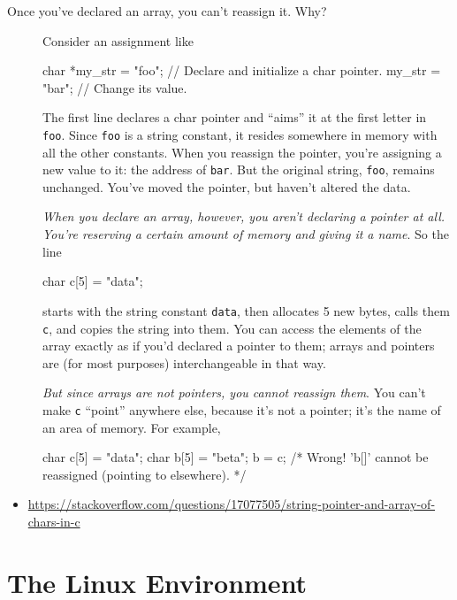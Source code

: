 \begin{description}
\item[Once you've declared an array, you can't reassign it. Why?] Consider an assignment like

\begin{ccode}
char *my_str = "foo"; // Declare and initialize a char pointer.
my_str = "bar"; // Change its value.
\end{ccode}

The first line declares a char pointer and ``aims'' it at the first letter in \texttt{foo}. Since \texttt{foo} is a string constant, it resides somewhere in memory with all the other constants. When you reassign the pointer, you're assigning a new value to it: the address of \texttt{bar}. But the original string, \texttt{foo}, remains unchanged. You've moved the pointer, but haven't altered the data.

\emph{When you declare an array, however, you aren't declaring a pointer at all. You're reserving a certain amount of memory and giving it a name}. So the line

\begin{ccode}
char c[5] = "data";
\end{ccode}

starts with the string constant \texttt{data}, then allocates 5 new bytes, calls them \texttt{c}, and copies the string into them. You can access the elements of the array exactly as if you'd declared a pointer to them; arrays and pointers are (for most purposes) interchangeable in that way.

\emph{But since arrays are not pointers, you cannot reassign them}. You can't make
\texttt{c} ``point'' anywhere else, because it's not a pointer; it's the name of an area of
memory. For example,

\begin{ccode}
char c[5] = "data";
char b[5] = "beta";
b = c; /* Wrong! 'b[]' cannot be reassigned (pointing to elsewhere). */
\end{ccode}
\end{description}

\begin{itemize}
\item \url{https://stackoverflow.com/questions/17077505/string-pointer-and-array-of-chars-in-c}
\end{itemize}  


\section{The Linux Environment}
\label{sec:linux-environment}

